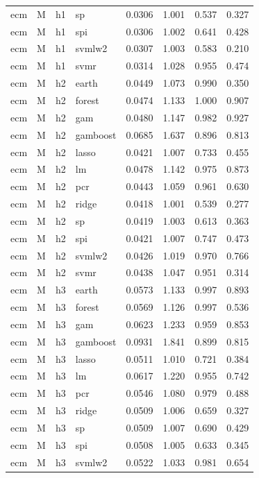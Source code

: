 \begin{ThreePartTable}
\begin{longtable}[t]{llclcccc}
ecm & M & h1 & sp & 0.0306 & 1.001 & 0.537 & 0.327\\
ecm & M & h1 & spi & 0.0306 & 1.002 & 0.641 & 0.428\\
ecm & M & h1 & svmlw2 & 0.0307 & 1.003 & 0.583 & 0.210\\
ecm & M & h1 & svmr & 0.0314 & 1.028 & 0.955 & 0.474\\
\addlinespace
ecm & M & h2 & earth & 0.0449 & 1.073 & 0.990 & 0.350\\
ecm & M & h2 & forest & 0.0474 & 1.133 & 1.000 & 0.907\\
ecm & M & h2 & gam & 0.0480 & 1.147 & 0.982 & 0.927\\
ecm & M & h2 & gamboost & 0.0685 & 1.637 & 0.896 & 0.813\\
ecm & M & h2 & lasso & 0.0421 & 1.007 & 0.733 & 0.455\\
ecm & M & h2 & lm & 0.0478 & 1.142 & 0.975 & 0.873\\
ecm & M & h2 & pcr & 0.0443 & 1.059 & 0.961 & 0.630\\
ecm & M & h2 & ridge & 0.0418 & 1.001 & 0.539 & 0.277\\
ecm & M & h2 & sp & 0.0419 & 1.003 & 0.613 & 0.363\\
ecm & M & h2 & spi & 0.0421 & 1.007 & 0.747 & 0.473\\
ecm & M & h2 & svmlw2 & 0.0426 & 1.019 & 0.970 & 0.766\\
ecm & M & h2 & svmr & 0.0438 & 1.047 & 0.951 & 0.314\\
\addlinespace
ecm & M & h3 & earth & 0.0573 & 1.133 & 0.997 & 0.893\\
ecm & M & h3 & forest & 0.0569 & 1.126 & 0.997 & 0.536\\
ecm & M & h3 & gam & 0.0623 & 1.233 & 0.959 & 0.853\\
ecm & M & h3 & gamboost & 0.0931 & 1.841 & 0.899 & 0.815\\
ecm & M & h3 & lasso & 0.0511 & 1.010 & 0.721 & 0.384\\
ecm & M & h3 & lm & 0.0617 & 1.220 & 0.955 & 0.742\\
ecm & M & h3 & pcr & 0.0546 & 1.080 & 0.979 & 0.488\\
ecm & M & h3 & ridge & 0.0509 & 1.006 & 0.659 & 0.327\\
ecm & M & h3 & sp & 0.0509 & 1.007 & 0.690 & 0.429\\
ecm & M & h3 & spi & 0.0508 & 1.005 & 0.633 & 0.345\\
ecm & M & h3 & svmlw2 & 0.0522 & 1.033 & 0.981 & 0.654\\

\end{longtable}
\end{ThreePartTable}
